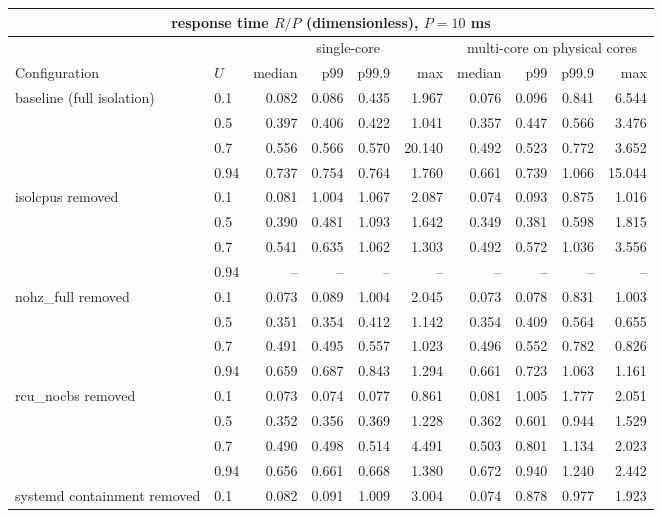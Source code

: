 \begin{tabular}{l|l|rrrr|rrrr}
\toprule
\multicolumn{10}{c}{response time $R/P$ (dimensionless), $P = 10$ ms} \\
\midrule
 &  & \multicolumn{4}{c}{single-core} & \multicolumn{4}{c}{multi-core on physical cores} \\
Configuration & $U$ & median & p99 & p99.9 & max & median & p99 & p99.9 & max \\
\midrule
\multirow[t]{4}{*}{baseline (full isolation)} & 0.1 & 0.082 & 0.086 & 0.435 & 1.967 & 0.076 & 0.096 & 0.841 & 6.544 \\
 & 0.5 & 0.397 & 0.406 & 0.422 & 1.041 & 0.357 & 0.447 & 0.566 & 3.476 \\
 & 0.7 & 0.556 & 0.566 & 0.570 & 20.140 & 0.492 & 0.523 & 0.772 & 3.652 \\
 & 0.94 & 0.737 & 0.754 & 0.764 & 1.760 & 0.661 & 0.739 & 1.066 & 15.044 \\
\cmidrule{1-10}
\multirow[t]{4}{*}{isolcpus removed} & 0.1 & 0.081 & 1.004 & 1.067 & 2.087 & 0.074 & 0.093 & 0.875 & 1.016 \\
 & 0.5 & 0.390 & 0.481 & 1.093 & 1.642 & 0.349 & 0.381 & 0.598 & 1.815 \\
 & 0.7 & 0.541 & 0.635 & 1.062 & 1.303 & 0.492 & 0.572 & 1.036 & 3.556 \\
 & 0.94 & -- & -- & -- & -- & -- & -- & -- & -- \\
\cmidrule{1-10}
\multirow[t]{4}{*}{nohz_full removed} & 0.1 & 0.073 & 0.089 & 1.004 & 2.045 & 0.073 & 0.078 & 0.831 & 1.003 \\
 & 0.5 & 0.351 & 0.354 & 0.412 & 1.142 & 0.354 & 0.409 & 0.564 & 0.655 \\
 & 0.7 & 0.491 & 0.495 & 0.557 & 1.023 & 0.496 & 0.552 & 0.782 & 0.826 \\
 & 0.94 & 0.659 & 0.687 & 0.843 & 1.294 & 0.661 & 0.723 & 1.063 & 1.161 \\
\cmidrule{1-10}
\multirow[t]{4}{*}{rcu_nocbs removed} & 0.1 & 0.073 & 0.074 & 0.077 & 0.861 & 0.081 & 1.005 & 1.777 & 2.051 \\
 & 0.5 & 0.352 & 0.356 & 0.369 & 1.228 & 0.362 & 0.601 & 0.944 & 1.529 \\
 & 0.7 & 0.490 & 0.498 & 0.514 & 4.491 & 0.503 & 0.801 & 1.134 & 2.023 \\
 & 0.94 & 0.656 & 0.661 & 0.668 & 1.380 & 0.672 & 0.940 & 1.240 & 2.442 \\
\cmidrule{1-10}
\multirow[t]{4}{*}{systemd containment removed} & 0.1 & 0.082 & 0.091 & 1.009 & 3.004 & 0.074 & 0.878 & 0.977 & 1.923 \\

\end{tabular}
